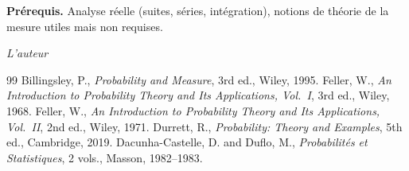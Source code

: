 \documentclass[12pt,a4paper,twoside]{book}
\theoremstyle{definition}
\theoremstyle{plain}
\theoremstyle{remark}
\begin{document}
\medskip

\noindent\textbf{Pr\'erequis.} Analyse r\'eelle (suites, s\'eries, int\'egration), notions de th\'eorie de la mesure utiles mais non requises.

\vfill
\hfill\textit{L'auteur}


\mainmatter















\backmatter
\begin{thebibliography}{99}
 Billingsley, P., \emph{Probability and Measure}, 3rd ed., Wiley, 1995.
 Feller, W., \emph{An Introduction to Probability Theory and Its Applications, Vol.~I}, 3rd ed., Wiley, 1968.
 Feller, W., \emph{An Introduction to Probability Theory and Its Applications, Vol.~II}, 2nd ed., Wiley, 1971.
 Durrett, R., \emph{Probability: Theory and Examples}, 5th ed., Cambridge, 2019.
 Dacunha-Castelle, D. and Duflo, M., \emph{Probabilit\'es et Statistiques}, 2 vols., Masson, 1982--1983.
\end{thebibliography}
\printindex
\end{document}
